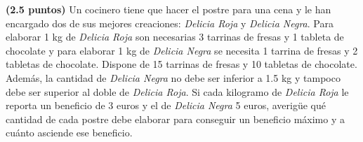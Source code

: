 
\textbf{(2.5 puntos)} Un cocinero tiene que hacer el postre para una cena
y le han encargado dos de sus mejores creaciones: \textit{Delicia Roja} y
\textit{Delicia Negra}. Para elaborar 1 kg de \textit{Delicia Roja} son
necesarias 3 tarrinas de fresas y 1 tableta de chocolate y para elaborar 1 kg
de \textit{Delicia Negra} se necesita 1 tarrina de fresas y 2 tabletas de
chocolate. Dispone de 15 tarrinas de fresas y 10 tabletas de chocolate.
Además, la cantidad de \textit{Delicia Negra} no debe ser inferior a 1.5 kg
y tampoco debe ser superior al doble de \textit{Delicia Roja}. Si cada
kilogramo de \textit{Delicia Roja} le reporta un beneficio de 3 euros y el de
\textit{Delicia Negra} 5 euros, averigüe qué cantidad de cada postre debe
elaborar para conseguir un beneficio máximo y a cuánto asciende ese beneficio.
